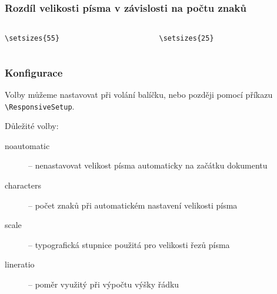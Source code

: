 \begin{frame}[fragile]
  \frametitle{Rozdíl velikosti písma v závislosti na počtu znaků}
\begin{columns}
  \begin{column}{0.5\textwidth}
\begin{verbatim}
\setsizes{55}
\end{verbatim}
\end{column}
\begin{column}{0.5\textwidth}
\begin{verbatim}
\setsizes{25}
\end{verbatim}
\end{column}
\end{columns}
\end{frame}

\begin{frame}[fragile]
  \frametitle{Konfigurace}
  Volby můžeme nastavovat při volání balíčku, nebo později pomocí příkazu \verb|\ResponsiveSetup|.

  Důležité volby:

  \begin{description}
    \item[noautomatic] -- nenastavovat velikost písma automaticky na začátku dokumentu
    \item[characters] -- počet znaků při automatickém nastavení velikosti písma
    \item[scale] --  typografická stupnice použitá pro velikosti řezů písma
    \item[lineratio] -- poměr využitý při výpočtu výšky řádku
  \end{description}

\end{frame}

